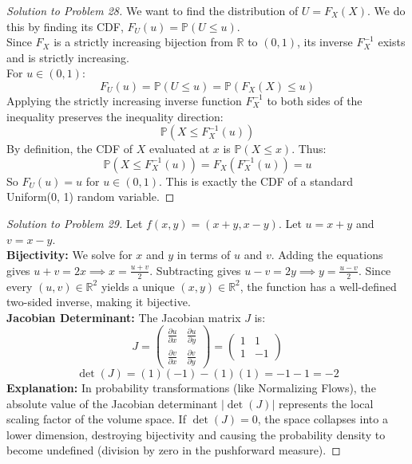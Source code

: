 \documentclass[11pt, letterpaper]{article}
\theoremstyle{definition}
\theoremstyle{remark}
\newcommand{\R}{\mathbb{R}}
\newcommand{\Prob}{\mathbb{P}}
\begin{document}
\begin{proof}[Solution to Problem 28]
We want to find the distribution of $U = F_X(X)$. We do this by finding its CDF, $F_U(u) = \Prob(U \le u)$. \\
Since $F_X$ is a strictly increasing bijection from $\R$ to $(0, 1)$, its inverse $F_X^{-1}$ exists and is strictly increasing. \\
For $u \in (0, 1)$:
\[ F_U(u) = \Prob(U \le u) = \Prob(F_X(X) \le u) \]
Applying the strictly increasing inverse function $F_X^{-1}$ to both sides of the inequality preserves the inequality direction:
\[ \Prob(X \le F_X^{-1}(u)) \]
By definition, the CDF of $X$ evaluated at $x$ is $\Prob(X \le x)$. Thus:
\[ \Prob(X \le F_X^{-1}(u)) = F_X(F_X^{-1}(u)) = u \]
So $F_U(u) = u$ for $u \in (0, 1)$. This is exactly the CDF of a standard Uniform(0, 1) random variable.
\end{proof}

\begin{proof}[Solution to Problem 29]
Let $f(x, y) = (x + y, x - y)$. Let $u = x + y$ and $v = x - y$. \\
\textbf{Bijectivity:} We solve for $x$ and $y$ in terms of $u$ and $v$. Adding the equations gives $u + v = 2x \implies x = \frac{u+v}{2}$. Subtracting gives $u - v = 2y \implies y = \frac{u-v}{2}$. Since every $(u, v) \in \R^2$ yields a unique $(x, y) \in \R^2$, the function has a well-defined two-sided inverse, making it bijective. \\
\textbf{Jacobian Determinant:} The Jacobian matrix $J$ is:
\[ J = \begin{pmatrix} \frac{\partial u}{\partial x} & \frac{\partial u}{\partial y} \\ \frac{\partial v}{\partial x} & \frac{\partial v}{\partial y} \end{pmatrix} = \begin{pmatrix} 1 & 1 \\ 1 & -1 \end{pmatrix} \]
\[ \det(J) = (1)(-1) - (1)(1) = -1 - 1 = -2 \]
\textbf{Explanation:} In probability transformations (like Normalizing Flows), the absolute value of the Jacobian determinant $|\det(J)|$ represents the local scaling factor of the volume space. If $\det(J) = 0$, the space collapses into a lower dimension, destroying bijectivity and causing the probability density to become undefined (division by zero in the pushforward measure).
\end{proof}
\end{document}
